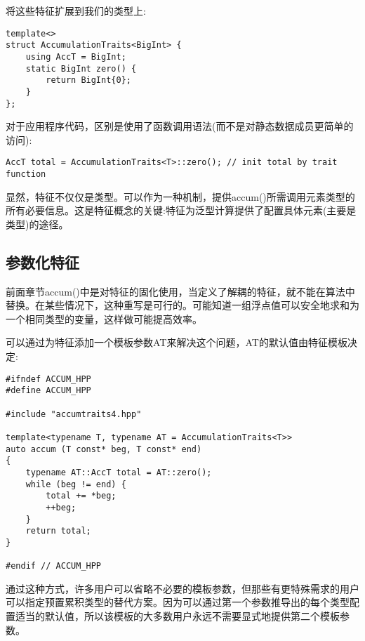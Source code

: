 将这些特征扩展到我们的类型上:

\begin{lstlisting}[style=styleCXX]
template<>
struct AccumulationTraits<BigInt> {
	using AccT = BigInt;
	static BigInt zero() {
		return BigInt{0};
	}
};
\end{lstlisting}

对于应用程序代码，区别是使用了函数调用语法(而不是对静态数据成员更简单的访问):

\begin{lstlisting}[style=styleCXX]
AccT total = AccumulationTraits<T>::zero(); // init total by trait function
\end{lstlisting}

显然，特征不仅仅是类型。可以作为一种机制，提供accum()所需调用元素类型的所有必要信息。这是特征概念的关键:特征为泛型计算提供了配置具体元素(主要是类型)的途径。

\subsection{参数化特征}

前面章节accum()中是对特征的固化使用，当定义了解耦的特征，就不能在算法中替换。在某些情况下，这种重写是可行的。可能知道一组浮点值可以安全地求和为一个相同类型的变量，这样做可能提高效率。

可以通过为特征添加一个模板参数AT来解决这个问题，AT的默认值由特征模板决定:

\begin{lstlisting}[style=styleCXX]
#ifndef ACCUM_HPP
#define ACCUM_HPP

#include "accumtraits4.hpp"

template<typename T, typename AT = AccumulationTraits<T>>
auto accum (T const* beg, T const* end)
{
	typename AT::AccT total = AT::zero();
	while (beg != end) {
		total += *beg;
		++beg;
	}
	return total;
}

#endif // ACCUM_HPP
\end{lstlisting}

通过这种方式，许多用户可以省略不必要的模板参数，但那些有更特殊需求的用户可以指定预置累积类型的替代方案。因为可以通过第一个参数推导出的每个类型配置适当的默认值，所以该模板的大多数用户永远不需要显式地提供第二个模板参数。









